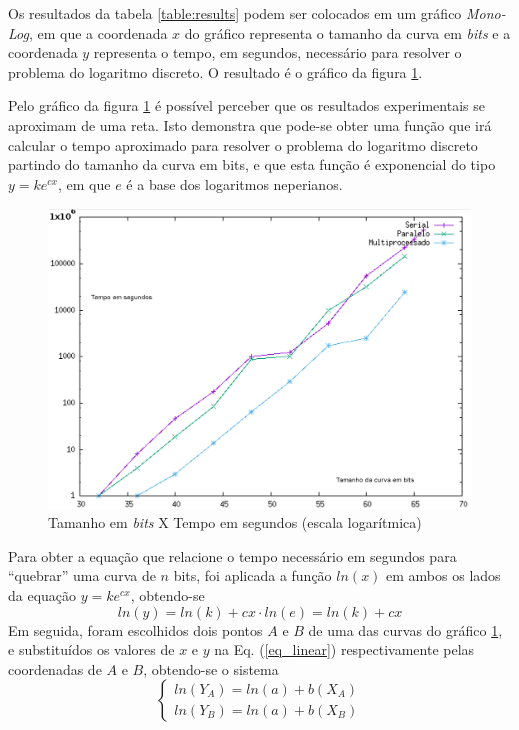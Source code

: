 Os resultados da tabela \ref{table:results} podem ser colocados em um gráfico \textit{Mono-Log}, em que a coordenada $x$ do gráfico representa o tamanho da curva em \textit{bits} e a coordenada $y$ representa o tempo, em segundos, necessário para resolver o problema do logaritmo discreto. O resultado é o gráfico da figura \ref{grafico1}.

Pelo gráfico da figura \ref{grafico1} é possível perceber que os resultados experimentais se aproximam de uma reta. Isto demonstra que pode-se obter uma função que irá calcular o tempo aproximado para resolver o problema do logaritmo discreto partindo do tamanho da curva em bits, e que esta função é exponencial do tipo \(y = ke^{cx}\), em que $e$ é a base dos logaritmos neperianos.

\begin{figure}[h]
\centering
\includegraphics[scale=0.6, bb=0 0 515 478]{figuras/grafico1.eps}
\caption{Tamanho em \textit{bits} X Tempo em segundos (escala logarítmica)}
\label{grafico1}
\end{figure}

Para obter a equação que relacione o tempo necessário em segundos para ``quebrar'' uma curva de $n$ bits, foi aplicada a função \(ln(x)\) em ambos os lados da equação \(y = ke^{cx}\), obtendo-se
\begin{equation} \label{eq_linear}
	ln(y) = ln(k) + cx\cdot ln(e) = ln(k) + cx
\end{equation}
Em seguida, foram escolhidos dois pontos \(A\) e \(B\) de uma das curvas do gráfico \ref{grafico1}, e substituídos os valores de \(x\) e \(y\) na Eq. (\ref{eq_linear}) respectivamente pelas coordenadas de \(A\) e \(B\), obtendo-se o sistema
\begin{equation*}
\left\{ \begin{array}{c}
ln(Y_A) = ln(a) + b(X_A)\\
ln(Y_B) = ln(a) + b(X_B)
\end{array}
\right.
\end{equation*}


